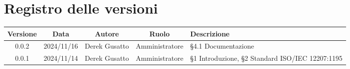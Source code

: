 
\section*{Registro delle versioni}
\begin{table}[H]
    \centering
    \begin{tabular}{|c|c|c|c|p{5cm}|}
        \hline
         \textbf{Versione} &  \textbf{Data} &  \textbf{Autore} &  \textbf{Ruolo} & \textbf{Descrizione} \\
          \hline
          0.0.2& 2024/11/16 & Derek Gusatto & Amministratore & §4.1 Documentazione\\
          \hline
          0.0.1& 2024/11/14 & Derek Gusatto & Amministratore & §1 Introduzione,  §2 Standard ISO/IEC 12207:1195\\
          \hline
    \end{tabular}
\end{table}